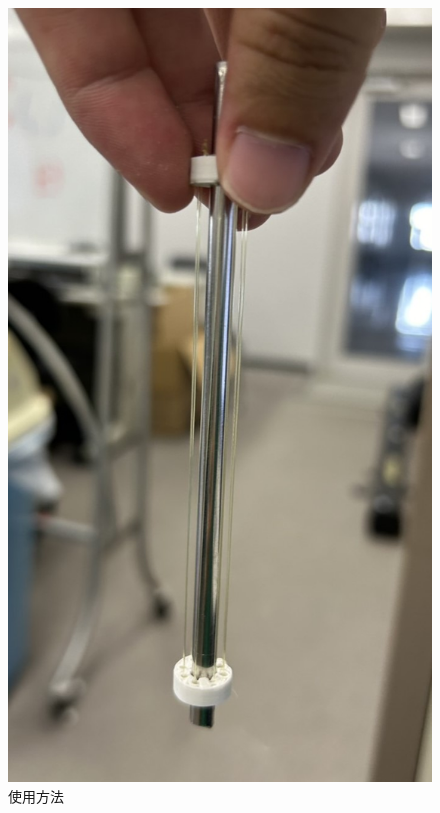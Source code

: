\begin{figure}[!b]
  \centering  %
  \includegraphics[scale=0.3]{pic/tukau.jpg}
  \caption{使用方法}
\end{figure}
